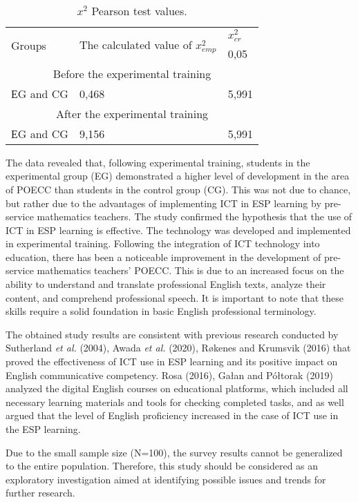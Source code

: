\begin{table}[htpb]
\centering
\begin{threeparttable}
\caption{$x^{2}$ Pearson test values.}
\label{tab-06}
\begin{tabular}{lll}
\toprule
\multirow{2}{*}{Groups} & \multicolumn{1}{p{3cm}}{\multirow{2}{=}{The calculated value of $x_{emp}^{2} $}} & $x_{cr}^{2} $ \\ 
 & & 0,05 \\
\midrule
\multicolumn{3}{c}{Before the experimental training} \\ 
ЕG and CG & 0,468 & 5,991 \\[0.3cm]
\multicolumn{3}{c}{After the experimental training} \\ 
ЕG and CG & 9,156 & 5,991 \\
\bottomrule
\end{tabular}
\end{threeparttable}
\end{table}
	
The data revealed that, following experimental training, students in the
experimental group (EG) demonstrated a higher level of development in
the area of POECC than students in the control group (CG). This was not
due to chance, but rather due to the advantages of implementing ICT in
ESP learning by pre-service mathematics teachers. The study confirmed
the hypothesis that the use of ICT in ESP learning is effective. The
technology was developed and implemented in experimental training.
Following the integration of ICT technology into education, there has
been a noticeable improvement in the development of pre-service
mathematics teachers' POECC. This is due to an
increased focus on the ability to understand and translate professional
English texts, analyze their content, and comprehend professional
speech. It is important to note that these skills require a solid
foundation in basic English professional terminology.

The obtained study results are consistent with previous research
conducted by Sutherland \emph{et al.} (2004), Awada \emph{et al.}
(2020), Røkenes and Krumsvik (2016) that proved the effectiveness of ICT
use in ESP learning and its positive impact on English communicative
competency. Rosa (2016), Gałan and Półtorak (2019) analyzed the digital
English courses on educational platforms, which included all necessary
learning materials and tools for checking completed tasks, and as well
argued that the level of English proficiency increased in the case of
ICT use in the ESP learning.


Due to the small sample size (N=100), the survey results cannot be
generalized to the entire population. Therefore, this study should be
considered as an exploratory investigation aimed at identifying possible
issues and trends for further research.

	

